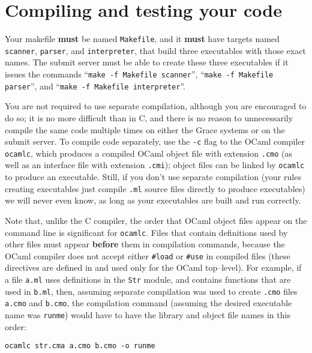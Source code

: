 \documentclass[11pt]{article}
\begin{document}
  \section{Compiling and testing your code}

    Your makefile \textbf{must} be named \texttt{Makefile}, and it
  \textbf{must} have targets named \texttt{scanner}, \texttt{parser}, and
  \texttt{interpreter}, that build three executables with those exact names.
  The submit server must be able to create these three executables if it
  issues the commands ``\texttt{make -f Makefile scanner}'', ``\texttt{make
  -f Makefile parser}'', and ``\texttt{make -f Makefile interpreter}''.

    You are not required to use separate compilation, although you are
  encouraged to do so; it is no more difficult than in C, and there is no
  reason to unnecessarily compile the same code multiple times on either the
  Grace systems or on the submit server.  To compile code separately, use
  the \texttt{-c} flag to the OCaml compiler \texttt{ocamlc}, which produces
  a compiled OCaml object file with extension \texttt{.cmo} (as well as an
  interface file with extension \texttt{.cmi}); object files can be linked
  by \texttt{ocamlc} to produce an executable.  Still, if you don't use
  separate compilation (your rules creating executables just compile
  \texttt{.ml} source files directly to produce executables) we will never
  even know, as long as your executables are built and run correctly.

    Note that, unlike the C compiler, the order that OCaml object files appear
  on the command line is significant for \texttt{ocamlc}.  Files that contain
  definitions used by other files must appear \textbf{before} them in
  compilation commands, because the OCaml compiler does not accept either
  \texttt{\#load} or \texttt{\#use} in compiled files (these directives are
  defined in and used only for the OCaml top--level).  For example, if a
  file \texttt{a.ml} uses definitions in the \texttt{Str} module, and
  contains functions that are used in \texttt{b.ml}, then, assuming separate
  compilation was used to create \texttt{.cmo} files \texttt{a.cmo} and
  \texttt{b.cmo}, the compilation command (assuming the desired executable
  name was \texttt{runme}) would have to have the library and object file
  names in this order:

    \vspace{-2mm}

    \begin{center}

      \texttt{ocamlc str.cma a.cmo b.cmo -o runme}

    \end{center}
\end{document}
